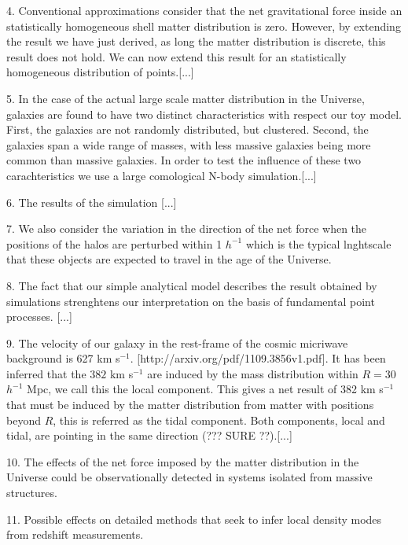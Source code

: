 \documentclass{article}
\begin{document}
4. Conventional approximations consider that the net gravitational force
inside an statistically homogeneous shell matter distribution is
zero. However, by extending the result we have just derived, as long
the matter distribution is discrete, this result does not hold. We can
now extend this result for an statistically homogeneous distribution
of points.[...]

5. In the case of the actual large scale matter distribution in the
Universe, galaxies are found to have two distinct characteristics with
respect our toy model. First, the galaxies are not randomly
distributed, but clustered. Second, the galaxies span a wide range of
masses, with less massive galaxies being more common than massive
galaxies. In order to test the influence of these two carachteristics
we use a large comological N-body simulation.[...]

6. The results of the simulation [...] 

7. We also consider the variation in the direction of the net force
when the positions of the halos are perturbed within 1 $h^{-1}$ which
is the typical lnghtscale that these objects are expected to travel in
the age of the Universe.


8. The fact that our simple analytical model describes the result
obtained by simulations strenghtens our interpretation on the basis of
fundamental point processes. [...]

9. The velocity of our galaxy in the rest-frame of the cosmic
micriwave background is 627 km
s$^{-1}$. [http://arxiv.org/pdf/1109.3856v1.pdf]. It has been inferred
that the $382$ km s$^{-1}$ are induced by the mass distribution within
$R=30$ $h^{-1}$ Mpc, we call this the local component. This gives a
net result of 382 km s$^{-1}$ that must be induced by the matter
distribution from matter with positions beyond $R$, this is referred
as the tidal component.  Both components, local and tidal, are
pointing in the same direction (??? SURE ??).[...]

10. The effects of the net force imposed by the matter distribution
in the Universe could be observationally detected in systems isolated 
from massive structures.

11. Possible effects on detailed methods that seek to infer local
density modes from redshift measurements. 
\end{document}
